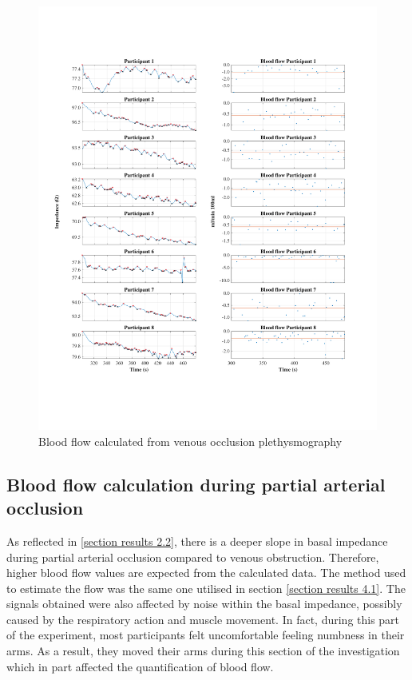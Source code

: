 \begin{figure}
	\includegraphics[width=\textwidth,height=\textheight,keepaspectratio,trim={0.5cm 0.5cm 2cm 2cm},clip]{figure12}    
	\caption{Blood flow calculated from venous occlusion plethysmography}
	\label{fig:blood_flow:venous_occlusion}
\end{figure}

\subsection{Blood flow calculation during partial arterial occlusion}
\label{section results 4.2}
As reflected in \ref{section results 2.2}, there is a deeper slope in basal impedance during partial arterial occlusion compared to venous obstruction. Therefore, higher blood flow values are expected from the calculated data. The method used to estimate the flow was the same one utilised in section \ref{section results 4.1}. The signals obtained were also affected by noise within the basal impedance, possibly caused by the respiratory action and muscle movement. In fact, during this part of the experiment, most participants felt uncomfortable feeling numbness in their arms. As a result, they moved their arms during this section of the investigation which in part affected the quantification of blood flow.

